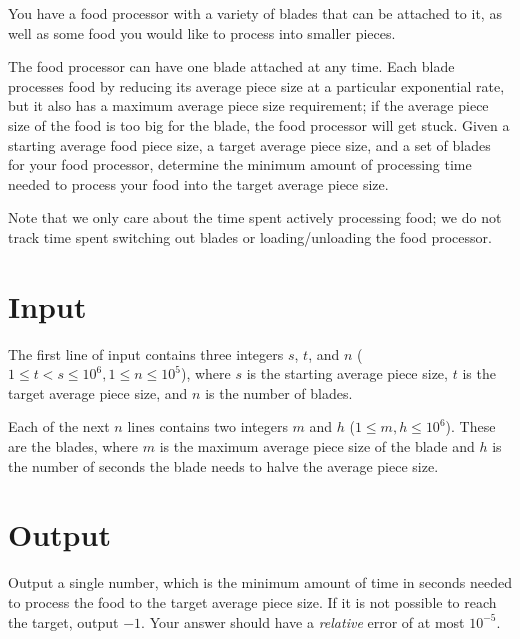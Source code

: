 
You have a food processor with a variety of blades that can be attached to it, as well as some food you would like to process into smaller pieces.

The food processor can have one blade attached at any time. 
Each blade processes food by reducing its average piece size at a particular exponential rate, but it also has a maximum average piece size requirement; 
if the average piece size of the food is too big for the blade, the food processor will get stuck. Given a starting average food piece size, a target average piece size, 
and a set of blades for your food processor, determine the minimum amount of processing time needed to process your food into the target average piece size. 

Note that we only care about the time spent actively processing food; we do not track time spent switching out blades or loading/unloading the food processor.

\section*{Input}
The first line of input contains three integers $s$, $t$, and $n$ ($1 \le t < s \le 10^6, 1 \le n \le 10^5$), where
$s$ is the starting average piece size, $t$ is the target average
piece size, and $n$ is the number of blades.

Each of the next $n$ lines contains two integers $m$ and $h$ ($1 \le m, h \le 10^6$). These are the
blades, where $m$ is the maximum average piece size of the blade and
$h$ is the number of seconds the blade needs to halve the average
piece size.

\section*{Output}

Output a single number, which is the minimum amount of time in
seconds needed to process the food to the target average piece size.
If it is not possible to reach the target, output $-1$. Your answer
should have a \textit{relative} error of at most $10^{-5}$.
